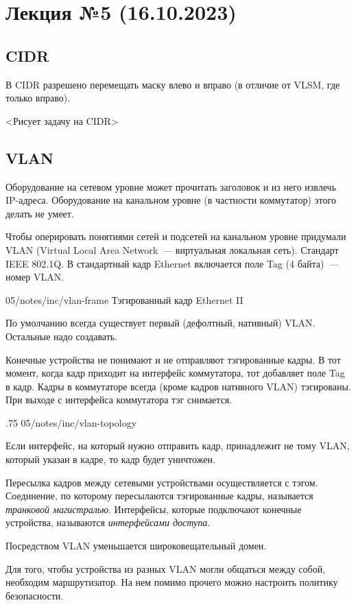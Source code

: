 \section{Лекция №5 (16.10.2023)}

\subsection{CIDR}

В CIDR разрешено перемещать маску влево и вправо (в отличие от VLSM, где только вправо).

<Рисует задачу на CIDR>

\subsection{VLAN}

Оборудование на сетевом уровне может прочитать заголовок и из него извлечь IP-адреса. Оборудование на канальном уровне (в частности коммутатор) этого делать не умеет.

Чтобы оперировать понятиями сетей и подсетей на канальном уровне придумали VLAN (Virtual Local Area Network~--- виртуальная локальная сеть). Стандарт IEEE 802.1Q. В стандартный кадр Ethernet включается поле Tag (4 байта)~--- номер VLAN.

\image
{\textwidth}
{05/notes/inc/vlan-frame}
{Тэгированный кадр Ethernet II}

По умолчанию всегда существует первый (дефолтный, нативный) VLAN. Остальные надо создавать.

Конечные устройства не понимают и не отправляют тэгированные кадры. В тот момент, когда кадр приходит на интерфейс коммутатора, тот добавляет поле Tag в кадр. Кадры в коммутаторе всегда (кроме кадров нативного VLAN) тэгированы. При выходе с интерфейса коммутатора тэг снимается.

\image
{.75\textwidth}
{05/notes/inc/vlan-topology}
{}

Если интерфейс, на который нужно отправить кадр, принадлежит не тому VLAN, который указан в кадре, то кадр будет уничтожен.

Пересылка кадров между сетевыми устройствами осуществляется с тэгом. Соединение, по которому пересылаются тэгированные кадры, называется \textit{транковой магистралью}. Интерфейсы, которые подключают конечные устройства, называются \textit{интерфейсами доступа}.

Посредством VLAN уменьшается широковещательный домен.

Для того, чтобы устройства из разных VLAN могли общаться между собой, необходим маршрутизатор. На нем помимо прочего можно настроить политику безопасности.

